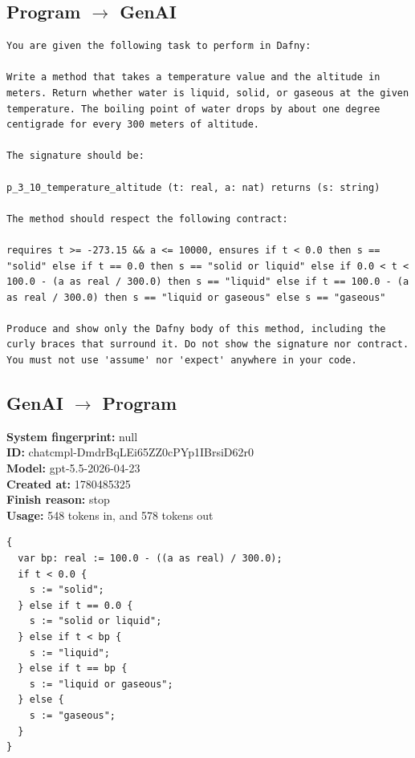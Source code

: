 \documentclass{article}
\begin{document}
\subsection*{Program $\rightarrow$ GenAI}
\begin{lstlisting}
You are given the following task to perform in Dafny:

Write a method that takes a temperature value and the altitude in meters. Return whether water is liquid, solid, or gaseous at the given temperature. The boiling point of water drops by about one degree centigrade for every 300 meters of altitude.

The signature should be:

p_3_10_temperature_altitude (t: real, a: nat) returns (s: string)

The method should respect the following contract:

requires t >= -273.15 && a <= 10000, ensures if t < 0.0 then s == "solid" else if t == 0.0 then s == "solid or liquid" else if 0.0 < t < 100.0 - (a as real / 300.0) then s == "liquid" else if t == 100.0 - (a as real / 300.0) then s == "liquid or gaseous" else s == "gaseous"

Produce and show only the Dafny body of this method, including the curly braces that surround it. Do not show the signature nor contract. You must not use 'assume' nor 'expect' anywhere in your code.
\end{lstlisting}
\subsection*{GenAI $\rightarrow$ Program}
\textbf{System fingerprint: }null
\\\textbf{ID: }chatcmpl-DmdrBqLEi65ZZ0cPYp1IBrsiD62r0
\\\textbf{Model: }gpt-5.5-2026-04-23
\\\textbf{Created at: }1780485325
\\\textbf{Finish reason: }stop
\\\textbf{Usage: }548 tokens in, and 578 tokens out
\begin{lstlisting}
{
  var bp: real := 100.0 - ((a as real) / 300.0);
  if t < 0.0 {
    s := "solid";
  } else if t == 0.0 {
    s := "solid or liquid";
  } else if t < bp {
    s := "liquid";
  } else if t == bp {
    s := "liquid or gaseous";
  } else {
    s := "gaseous";
  }
}
\end{lstlisting}
\end{document}
